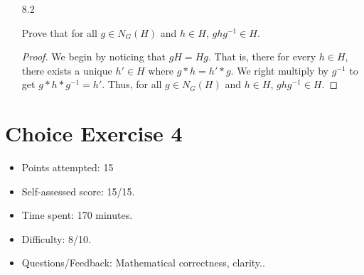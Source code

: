 \documentclass{article}
\newcommand{\reflection}[5]{
    \begin{itemize}
    \item Points attempted: #1
    \item Self-assessed score: #2/#1.
    \item Time spent: #3 minutes.
    \item Difficulty: #4/10.
    \item Questions/Feedback: #5.
    \end{itemize}
}
\begin{document}
\begin{enumerate}
{{\begin{enumerate}
{\begin{proof}
                        Since \(H\) itself is closed, \(h_1' * h_1'^{-1} * h_2'' \in H\).
                        Therefore, \(n_1 * n_2\) is also a normalizer \(N_G(H)\).
                        Thus, \(N_G(H)\) is is closed, so \(N_G(H)\) is a subgroup 
                        of \(G\).
                    \end{proof}
                }

                \item [8.2] {
                    Prove that for all \(g \in N_G(H)\) and \(h \in H\), 
                    \(g h g^{-1} \in H\).

                    \begin{proof}
                        We begin by noticing that \(gH = Hg\). That is, there 
                        for every \(h \in H\), there exists a unique \(h' \in H\)
                        where \(g * h = h' * g\). We right multiply by \(g^{-1}\) 
                        to get \(g * h * g^{-1} = h'\). Thus, for all 
                        \(g \in N_G(H)\) and \(h \in H\), \(g h g^{-1} \in H\). 
                    \end{proof}
                }
            \end{enumerate}
        }
    }
\end{enumerate}
\pagebreak

\section*{Choice Exercise 4}
\reflection{15}{15}{170}{8}{Mathematical correctness, clarity.}
\end{document}
